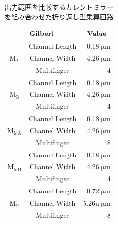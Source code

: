             \begin{table}[!b]
                \centering
                \caption{出力範囲を比較するカレントミラーを組み合わせた折り返し型乗算回路}
                \label{table:3_folded_mirror_com_param}
                \begin{tabular}{c|c|r}
                    \hline
                    \multicolumn{2}{c}{Gilbert}   & \multicolumn{1}{c}{Value}     \\
                    \hline\hline
                    &   Channel Length   &   0.18 $\mathrm{\mu m}$   \\
                    \cline{2-3}
                    $\mathrm{M_{A}}$   &   Channel Width   &   4.26 $\mathrm{\mu m}$   \\
                    \cline{2-3}
                        &   Multifinger   & 4    \\
                    \hline
                    &   Channel Length   &   0.18 $\mathrm{\mu m}$   \\
                    \cline{2-3}
                    $\mathrm{M_{B}}$   &   Channel Width   &   4.26 $\mathrm{\mu m}$   \\
                    \cline{2-3}
                        &   Multifinger   & 4    \\
                    \hline
                    &   Channel Length   &   0.18 $\mathrm{\mu m}$   \\
                    \cline{2-3}
                    $\mathrm{M_{MA}}$   &   Channel Width   &   4.26 $\mathrm{\mu m}$   \\
                    \cline{2-3}
                        &   Multifinger   & 8    \\
                    \hline
                    &   Channel Length   &   0.18 $\mathrm{\mu m}$   \\
                    \cline{2-3}
                    $\mathrm{M_{MB}}$   &   Channel Width   &   4.26 $\mathrm{\mu m}$   \\
                    \cline{2-3}
                        &   Multifinger   & 4    \\
                    \hline
                    &   Channel Length   &   0.72 $\mathrm{\mu m}$   \\
                    \cline{2-3}
                    $\mathrm{M_{U}}$   &   Channel Width   &   5.26u $\mathrm{\mu m}$   \\
                    \cline{2-3}
                        &   Multifinger   & 8    \\

\end{tabular}
\end{table}

